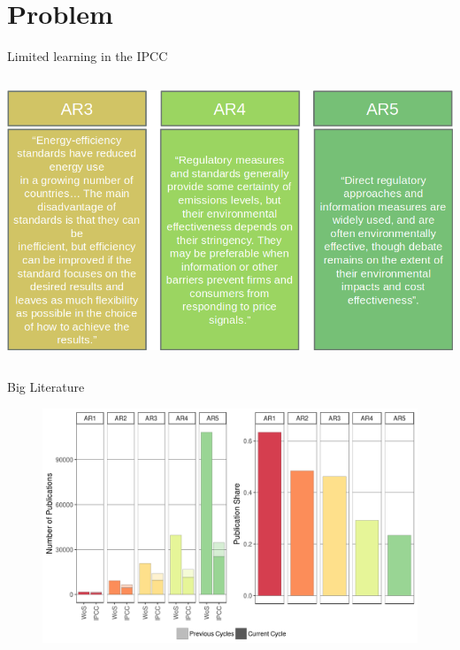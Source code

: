 \documentclass[9pt]{beamer}
\begin{document}
\section{Problem}

\begin{frame}{Limited learning in the IPCC}

\begin{columns}
	\begin{column}{1\linewidth}
		\includegraphics[width=\linewidth]{images/learning_climate.png}
	\end{column}
\end{columns}
 
\end{frame}

\begin{frame}{Big Literature}

	\begin{figure}
		\includegraphics[width=\linewidth]{images/merged_IPCC_spectral}
		\caption{\citep{Minx2017l}}
	\end{figure}

\end{frame}
\end{document}

